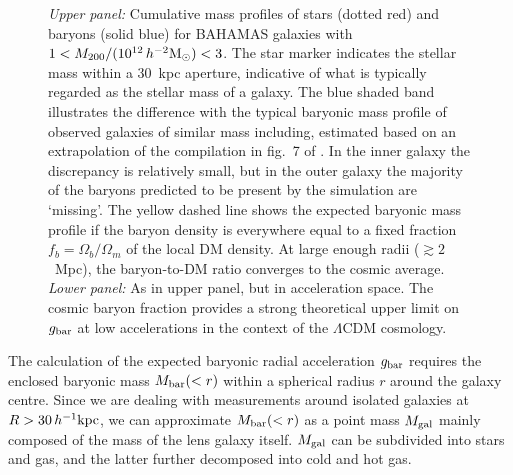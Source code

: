 \documentclass[usenatbib]{mnras}
\newcommand{\hmsun}{\,h^{-2} {\rm M_\odot}}
\newcommand{\hkpc}{\, h^{-1}{\rm{kpc}} }
\newcommand{\un}[1]{_{\rm #1}}
\begin{document}
\begin{figure}
	\caption{\emph{Upper panel: }Cumulative mass profiles of stars (dotted red) and baryons (solid blue) for BAHAMAS galaxies with $1<M_{200}/(10^{12}\hmsun)<3$. The star marker indicates the stellar mass within a $30$~kpc aperture, indicative of what is typically regarded as the stellar mass of a galaxy. The blue shaded band illustrates the difference with the typical baryonic mass profile of observed galaxies of similar mass including, estimated based on an extrapolation of the compilation in fig.~7 of \citet{tumlinson2017}. In the inner galaxy the discrepancy is relatively small, but in the outer galaxy the majority of the baryons predicted to be present by the simulation are `missing'. The yellow dashed line shows the expected baryonic mass profile if the baryon density is everywhere equal to a fixed fraction $f_b=\Omega_b/\Omega_m$ of the local DM density. At large enough radii ($\gtrsim 2$~Mpc), the baryon-to-DM ratio converges to the cosmic average. \emph{Lower panel: } As in upper panel, but in acceleration space. The cosmic baryon fraction provides a strong theoretical upper limit on $g\un{bar}$ at low accelerations in the context of the $\Lambda$CDM cosmology.}
	\label{fig:missing-baryons}
\end{figure}

The calculation of the expected baryonic radial acceleration $g\un{bar}$ requires the enclosed baryonic mass $M\un{bar}(<r)$ within a spherical radius $r$ around the galaxy centre. Since we are dealing with measurements around isolated galaxies at $R>30\hkpc$, we can approximate $M\un{bar}(<r)$ as a point mass $M\un{gal}$ mainly composed of the mass of the lens galaxy itself. $M\un{gal}$ can be subdivided into stars and gas, and the latter further decomposed into cold and hot gas.
\end{document}
